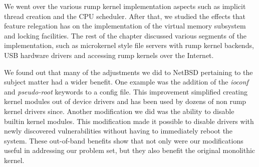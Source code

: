We went over the various rump kernel implementation aspects such
as implicit thread creation and the CPU scheduler.  After that, we
studied the effects that feature relegation has on the implementation
of the virtual memory subsystem and locking facilities.  The rest
of the chapter discussed various segments of the implementation,
such as microkernel style file servers with rump kernel backends, USB
hardware drivers and accessing rump kernels over the Internet.

We found out that many of the adjustments we did to NetBSD pertaining to
the subject matter had a wider benefit.  One example was the addition
of the \textit{ioconf} and \textit{pseudo-root} keywords to a config
file.  This improvement simplified creating kernel modules out of device drivers
and has been used by dozens of non rump kernel drivers since.
Another modification we did was the ability to disable builtin
kernel modules.  This modification made it possible to disable drivers with
newly discovered vulnerabilities without having to immediately
reboot the system.  These out-of-band benefits show that not only
were our modifications useful in addressing our problem set, but
they also benefit the original monolithic kernel.
